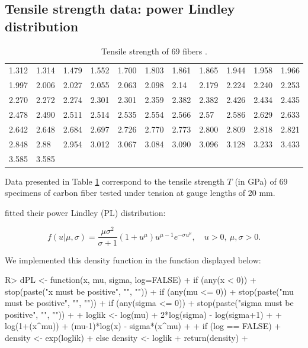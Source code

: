 \documentclass[nojss]{jss}
\begin{document}
\subsection{Tensile strength data: power Lindley distribution}

\begin{table}[H]
\centering
\begin{tabular}{lllllllllll}
      &       &       &       &       &       &       &       &       &       &       \\ \hline
1.312 & 1.314 & 1.479 & 1.552 & 1.700 & 1.803 & 1.861 & 1.865 & 1.944 & 1.958 & 1.966 \\
1.997 & 2.006 & 2.027 & 2.055 & 2.063 & 2.098 & 2.14  & 2.179 & 2.224 & 2.240 & 2.253 \\
2.270 & 2.272 & 2.274 & 2.301 & 2.301 & 2.359 & 2.382 & 2.382 & 2.426 & 2.434 & 2.435 \\
2.478 & 2.490 & 2.511 & 2.514 & 2.535 & 2.554 & 2.566 & 2.57  & 2.586 & 2.629 & 2.633 \\
2.642 & 2.648 & 2.684 & 2.697 & 2.726 & 2.770 & 2.773 & 2.800 & 2.809 & 2.818 & 2.821 \\
2.848 & 2.88  & 2.954 & 3.012 & 3.067 & 3.084 & 3.090 & 3.096 & 3.128 & 3.233 & 3.433 \\
3.585 & 3.585 &       &       &       &       &       &       &       &       &       \\ \hline
\end{tabular}
\caption{\label{tab:PLdata}Tensile strength of 69 fibers \citep{Devendra2013}.}
\end{table}

Data presented in Table \ref{tab:PLdata} correspond to the tensile strength $T$ (in GPa) of 69 specimens of carbon fiber tested under tension at gauge lengths of 20 mm.

\cite{Ghitany2013} fitted their power Lindley (PL) distribution:

\begin{equation}
f(u|\mu,\sigma) = \frac{\mu \sigma^2}{\sigma + 1} (1 + u^\mu) u ^ {\mu - 1} e^{-\sigma u ^\mu}, \quad u>0, \: \mu, \sigma>0.
\end{equation}

We implemented this density function in the  function  displayed below:

\begin{Schunk}
\begin{Sinput}
R> dPL <- function(x, mu, sigma, log=FALSE){
+    if (any(x < 0))
+      stop(paste("x must be positive", "\n", ""))
+    if (any(mu <= 0))
+      stop(paste("mu must be positive", "\n", ""))
+    if (any(sigma <= 0))
+      stop(paste("sigma must be positive", "\n", ""))
+  
+    loglik <- log(mu) + 2*log(sigma) - log(sigma+1) +
+      log(1+(x^mu)) + (mu-1)*log(x) - sigma*(x^mu)
+  
+    if (log == FALSE)
+      density <- exp(loglik)
+    else density <- loglik
+    return(density)
+  }
\end{Sinput}
\end{Schunk}
\end{document}
